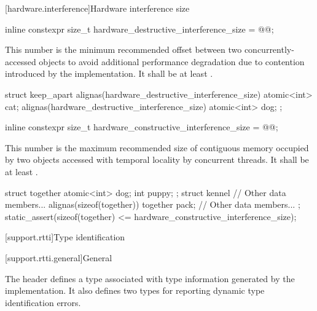 [hardware.interference]{Hardware interference size}

%
\begin{itemdecl}
inline constexpr size_t hardware_destructive_interference_size = @\impdef{}@;
\end{itemdecl}

\pnum
This number is the minimum recommended offset
between two concurrently-accessed objects
to avoid additional performance degradation due to contention
introduced by the implementation.
It shall be at least .

%
\begin{example}
\begin{codeblock}
struct keep_apart {
  alignas(hardware_destructive_interference_size) atomic<int> cat;
  alignas(hardware_destructive_interference_size) atomic<int> dog;
};
\end{codeblock}
\end{example}

%
\begin{itemdecl}
inline constexpr size_t hardware_constructive_interference_size = @\impdef{}@;
\end{itemdecl}

\pnum
This number is the maximum recommended size of contiguous memory
occupied by two objects accessed with temporal locality by concurrent threads.
It shall be at least .

%
\begin{example}
\begin{codeblock}
struct together {
  atomic<int> dog;
  int puppy;
};
struct kennel {
  // Other data members...
  alignas(sizeof(together)) together pack;
  // Other data members...
};
static_assert(sizeof(together) <= hardware_constructive_interference_size);
\end{codeblock}
\end{example}

[support.rtti]{Type identification}

[support.rtti.general]{General}

\pnum
The header  defines a
type associated with type information generated by the implementation.
It also defines two types for reporting dynamic type identification errors.

